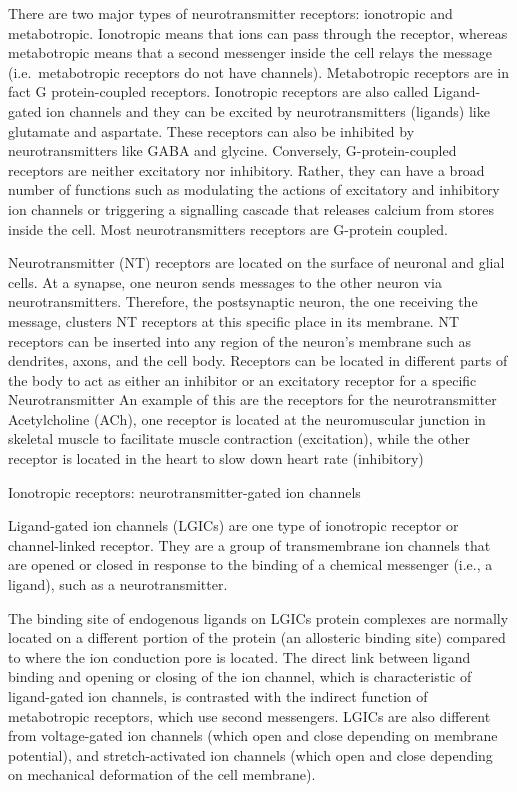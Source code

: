 There are two major types of neurotransmitter receptors: ionotropic and metabotropic. Ionotropic means that ions can pass through the receptor, whereas metabotropic means that a second messenger inside the cell relays the message (i.e.~metabotropic receptors do not have channels). Metabotropic receptors are in fact G protein-coupled receptors. Ionotropic receptors are also called Ligand-gated ion channels and they can be excited by neurotransmitters (ligands) like glutamate and aspartate. These receptors can also be inhibited by neurotransmitters like GABA and glycine. Conversely, G-protein-coupled receptors are neither excitatory nor inhibitory. Rather, they can have a broad number of functions such as modulating the actions of excitatory and inhibitory ion channels or triggering a signalling cascade that releases calcium from stores inside the cell. Most neurotransmitters receptors are G-protein coupled.

Neurotransmitter (NT) receptors are located on the surface of neuronal and glial cells. At a synapse, one neuron sends messages to the other neuron via neurotransmitters. Therefore, the postsynaptic neuron, the one receiving the message, clusters NT receptors at this specific place in its membrane. NT receptors can be inserted into any region of the neuron's membrane such as dendrites, axons, and the cell body. Receptors can be located in different parts of the body to act as either an inhibitor or an excitatory receptor for a specific Neurotransmitter An example of this are the receptors for the neurotransmitter Acetylcholine (ACh), one receptor is located at the neuromuscular junction in skeletal muscle to facilitate muscle contraction (excitation), while the other receptor is located in the heart to slow down heart rate (inhibitory)

Ionotropic receptors: neurotransmitter-gated ion channels

Ligand-gated ion channels (LGICs) are one type of ionotropic receptor or channel-linked receptor. They are a group of transmembrane ion channels that are opened or closed in response to the binding of a chemical messenger (i.e., a ligand), such as a neurotransmitter.

The binding site of endogenous ligands on LGICs protein complexes are normally located on a different portion of the protein (an allosteric binding site) compared to where the ion conduction pore is located. The direct link between ligand binding and opening or closing of the ion channel, which is characteristic of ligand-gated ion channels, is contrasted with the indirect function of metabotropic receptors, which use second messengers. LGICs are also different from voltage-gated ion channels (which open and close depending on membrane potential), and stretch-activated ion channels (which open and close depending on mechanical deformation of the cell membrane).

